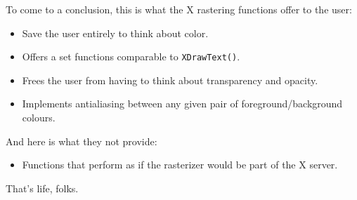 To come to a conclusion, this is what the X rastering functions offer to the
user: 
\begin{itemize}
\item Save the user entirely to think about color.
\item Offers a set functions comparable to \verb+XDrawText()+.
\item Frees the user from having to think about transparency and opacity.
\item Implements antialiasing between any given pair of foreground/background
  colours.
\end{itemize}
And here is what they not provide:
\begin{itemize}
\item Functions that perform as if the rasterizer would be part of the X
  server.
\end{itemize}
That's life, folks.



